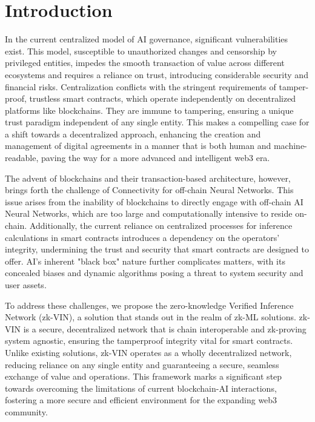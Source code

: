 \documentclass[conference]{IEEEtran}
\begin{document}


\section{Introduction}
In the current centralized model of AI governance, significant vulnerabilities exist. This model, susceptible to unauthorized changes and censorship by privileged entities, impedes the smooth transaction of value across different ecosystems and requires a reliance on trust, introducing considerable security and financial risks. Centralization conflicts with the stringent requirements of tamper-proof, trustless smart contracts, which operate independently on decentralized platforms like blockchains. They are immune to tampering, ensuring a unique trust paradigm independent of any single entity. This makes a compelling case for a shift towards a decentralized approach, enhancing the creation and management of digital agreements in a manner that is both human and machine-readable, paving the way for a more advanced and intelligent web3 era.

The advent of blockchains and their transaction-based architecture, however, brings forth the challenge of Connectivity for off-chain Neural Networks.  This issue arises from the inability of blockchains to directly engage with off-chain AI Neural Networks, which are too large and computationally intensive to reside on-chain. Additionally, the current reliance on centralized processes for inference calculations in smart contracts introduces a dependency on the operators' integrity, undermining the trust and security that smart contracts are designed to offer. AI's inherent "black box" nature further complicates matters, with its concealed biases and dynamic algorithms posing a threat to system security and user assets.

To address these challenges, we propose the zero-knowledge Verified Inference Network (zk-VIN), a solution that stands out in the realm of zk-ML solutions. zk-VIN is a secure, decentralized network that is chain interoperable and zk-proving system agnostic, ensuring the tamperproof integrity vital for smart contracts. Unlike existing solutions, zk-VIN operates as a wholly decentralized network, reducing reliance on any single entity and guaranteeing a secure, seamless exchange of value and operations. This framework marks a significant step towards overcoming the limitations of current blockchain-AI interactions, fostering a more secure and efficient environment for the expanding web3 community.
\end{document}
